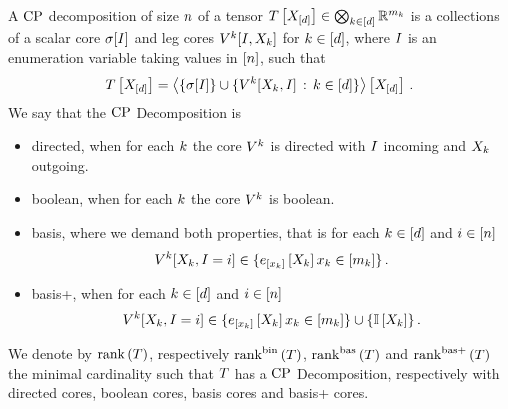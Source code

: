 \begin{definition}
    \label{def:cpFormats}
    A $\mathrm{CP}$ decomposition of size $n$ of a tensor $ T\left[X_{[d]}\right]\in\bigotimes_{k\in[d]} \mathbb{R}^{m_{k}}$ is a collections of a scalar core $\sigma[I]$ and leg cores $V^{k}[I,X_{k}]$ for $k\in[d]$, where $I$ is an enumeration variable taking values in $[n]$, such that
    \begin{align*}
        T\left[X_{[d]}\right]
        = \left\langle 
            \{\sigma[I]\} \cup \{ V^{k}[X_{k},I] \, : \, k\in[d] \}
        \right\rangle \left[ X_{[d]} \right] \, .
    \end{align*}
    We say that the $\mathrm{CP}$ Decomposition is
    \begin{itemize}
        \item directed, when for each $k$ the core $V^{k}$ is directed with $I$ incoming and $X_{k}$ outgoing.
        \item boolean, when for each $k$ the core $V^{k}$ is boolean.
        \item basis, where we demand both properties, that is for each $k\in[d]$ and $i\in[n]$
        \begin{align*}
            V^{k}[X_{k},I=i]\in \{e_{[x_{k}]}\left[X_{k}\right] x_{k}\in[m_{k}] \}\, .
        \end{align*}
        \item basis+, when for each $k\in[d]$ and $i\in[n]$  %
        \begin{align*}
            V^{k}[X_{k},I=i]\in \{e_{[x_{k}]}\left[X_{k}\right] x_{k}\in[m_{k}] \} \cup \{\mathbb{I}\left[X_{k}\right]\}\, .
        \end{align*}
    \end{itemize}
    We denote by $\mathrm{rank}\left(T\right)$, respectively $\mathrm{rank}^{\mathrm{bin}}\left(T\right)$, $\mathrm{rank}^{\mathrm{bas}}\left(T\right)$ and $\mathrm{rank}^{\mathrm{bas+}}\left(T\right)$ the minimal cardinality such that $T$ has a $\mathrm{CP}$ Decomposition, respectively with directed cores, boolean cores, basis cores and basis+ cores.
\end{definition}


